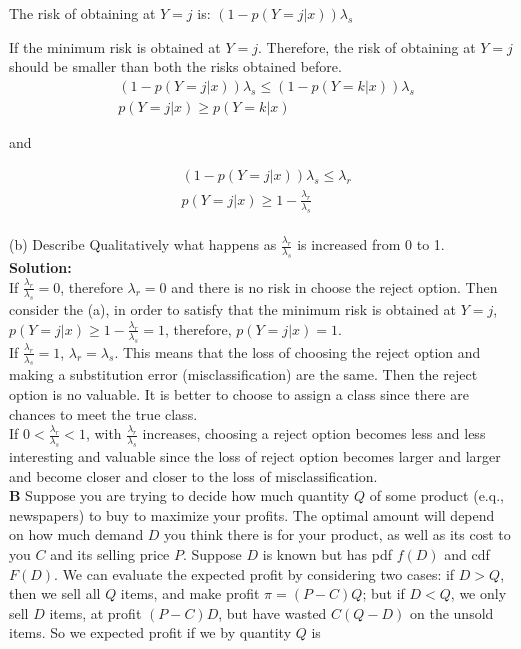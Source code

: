 \documentclass{article}
\begin{document}
The risk of obtaining at $Y=j$ is: $(1-p(Y=j|x))\lambda_s$

If the minimum risk is obtained at $Y=j$. Therefore, the risk of obtaining at $Y=j$ should be smaller than both the risks obtained before.
\begin{equation}
\begin{aligned}
& (1-p(Y=j|x))\lambda_s \leq (1-p(Y=k|x))\lambda_s \\
& p(Y=j|x) \geq p(Y=k|x)
\end{aligned}
\end{equation}

and

\begin{equation}
\begin{aligned}
& (1-p(Y=j|x))\lambda_s \leq \lambda_r \\
& p(Y=j|x) \geq 1 - \frac{\lambda_r}{\lambda_s}
\end{aligned}
\end{equation}
\\
(b) Describe Qualitatively what happens as $\frac{\lambda_r}{\lambda_s}$ is increased from 0 to 1.\\
\textbf{Solution:} \\
If $\frac{\lambda_r}{\lambda_s} = 0$, therefore $\lambda_{r} = 0$ and there is no risk in choose the reject option. Then consider the (a), in order to satisfy that the minimum risk is obtained at $Y=j$, $p(Y=j|x) \geq 1 - \frac{\lambda_r}{\lambda_s} = 1$, therefore, $p(Y=j|x) = 1$. \\
If $\frac{\lambda_r}{\lambda_s} = 1$, $\lambda_r= \lambda_s$. This means that the loss of choosing the reject option and making a substitution error (misclassification) are the same. Then the reject option is no valuable. It is better to choose to assign a class since there are chances to meet the true class.\\
If $0<\frac{\lambda_r}{\lambda_s} <1$, with $\frac{\lambda_r}{\lambda_s}$ increases, choosing a reject option becomes less and less interesting and valuable since the loss of reject option becomes larger and larger and become closer and closer to the loss of misclassification.
\\
\textbf{B} Suppose you are trying to decide how much quantity $Q$ of some product (e.q., newspapers) to buy to maximize your profits. The optimal amount will depend on how much demand $D$ you think there is for your product, as well as its cost to you $C$ and its selling price $P$. Suppose $D$ is known but has pdf $f(D)$ and cdf $F(D)$. We can evaluate the expected profit by considering two cases: if $D>Q$, then we sell all $Q$ items, and make profit $\pi = (P-C)Q$; but if $D<Q$, we only sell $D$ items, at profit $(P-C)D$, but have wasted $C(Q-D)$ on the unsold items. So we expected profit if we by quantity $Q$ is
\end{document}
